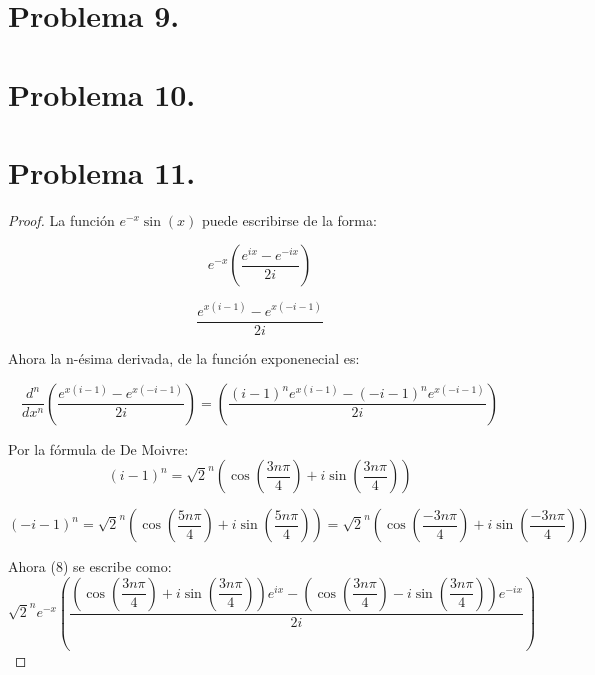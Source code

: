 \documentclass[11pt]{article}
\theoremstyle{Tema} \newtheorem{Tema}{Tema} %
\theoremstyle{Tema} \newtheorem{serie}{Serie}              %
\theoremstyle{Tema} \newtheorem{ejercicio}{Ejercicio}    %
\begin{document}
		\section*{\textbf{Problema 9.} }
	
		\section*{\textbf{Problema 10.} }
	
		
		\section*{\textbf{Problema 11.} }
	
		\begin{proof}
			
		La funci\'on $ e^{-x} \sin(x) $ puede escribirse de la forma:	
			
			\begin{equation*}
			e^{-x}\left(\dfrac{e^{ix}-e^{-ix}}{2i}\right)
			\end{equation*}
			
			
			
			\begin{equation*}
			\dfrac{e^{x(i-1)}-e^{x(-i-1)}}{2i}
			\end{equation*}
			
	Ahora la n-\'esima derivada, de la funci\'on exponenecial es:
	
	\begin{equation}
	\dfrac{d^n}{dx^n}\left(	\dfrac{e^{x(i-1)}-e^{x(-i-1)}}{2i}\right)=\left(\dfrac{(i-1)^ne^{x(i-1)}-(-i-1)^ne^{x(-i-1)}}{2i}\right)
	\end{equation}		
			
			
	Por la f\'ormula de De Moivre:
	\begin{equation*}
	(i-1)^n=\sqrt{2}^n\left(\cos\left(\dfrac{3n\pi}{4}\right)+i\sin\left(\dfrac{3n\pi}{4}\right)\right)
	\end{equation*}	
	
	\begin{equation*}
	(-i-1)^n=\sqrt{2}^n\left(\cos\left(\dfrac{5n\pi}{4}\right)+i\sin\left(\dfrac{5n\pi}{4}\right)\right)=
	\sqrt{2}^n\left(\cos\left(\dfrac{-3n\pi}{4}\right)+i\sin\left(\dfrac{-3n\pi}{4}\right)\right)
	\end{equation*}		
			
			
Ahora (8) se escribe como:
\begin{equation*}
\sqrt{2}^ne^{-x}\left(\dfrac{\left(\cos\left(\dfrac{3n\pi}{4}\right)+i\sin\left(\dfrac{3n\pi}{4}\right)\right)e^{ix}-\left(\cos\left(\dfrac{3n\pi}{4}\right)-i\sin\left(\dfrac{3n\pi}{4}\right)\right)e^{-ix}}{2i}\right)
\end{equation*}			
			

\end{proof}
\end{document}
